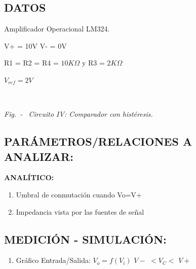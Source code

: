 \subsection{DATOS}
Amplificador Operacional LM324.

V+ = 10V V- = 0V

R1 = R2 = R4 = $10K\Omega$ y R3 = $2K\Omega$

$V_{ref}=2V$

\begin{center}
	 \\
	\begin{center}
    	\begin{small}
        \textit{Fig.\thefigure \ - \ 	Circuito IV: Comparador con histéresis.}
		\end{small}
    \end{center}
\end{center}

\subsection{PARÁMETROS/RELACIONES A ANALIZAR:}

\noindent \textbf{ANALÍTICO:}
\begin{enumerate}[4.1]
    \item Umbral de conmutación cuando Vo=V+
    \item Impedancia vista por las fuentes de señal
\end{enumerate}

\subsection{MEDICIÓN - SIMULACIÓN:}
\begin{enumerate}[4.3]
    \item Gráfico Entrada/Salida: $V_{o}=f(V_{i})$\hspace{0.25cm} $V-$ $<V_{C}<$ $V+$
\end{enumerate}
